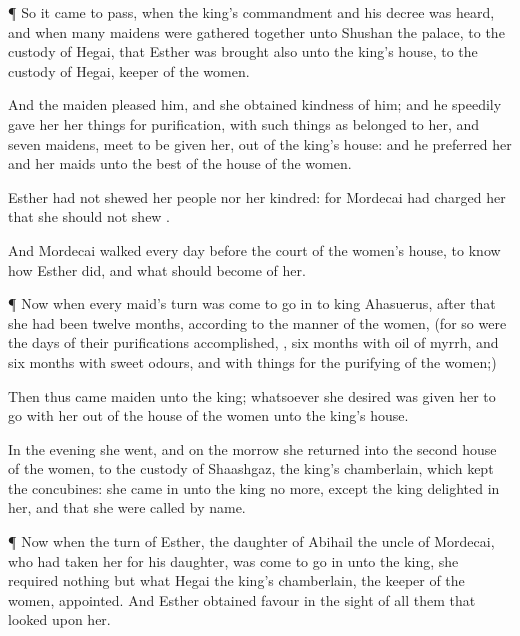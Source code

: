 {\par }{\PP {}¶ So it came to pass, when the
king’s
commandment and his
decree was
heard, and when
many
maidens were gathered
together unto
Shushan the
palace, to the
custody of
Hegai, that
Esther was
brought also unto the
king’s
house, to the
custody of
Hegai,
keeper of the
women.

And the
maiden
pleased him, and she
obtained
kindness of
him; and he
speedily
gave her her things for
purification, with such things as
belonged to her, and
seven
maidens,
{}
meet to be
given her, out of the
king’s
house: and he
preferred her and her
maids unto the
best
{} of the
house of the
women.

Esther had not
shewed her
people nor her
kindred: for
Mordecai had
charged her that she should not
shew
{}.

And
Mordecai
walked every
day
before the
court of the
women’s
house, to
know how
Esther
did, and what should
become of her.


\par }{\PP {}¶ Now when every
maid’s
turn was
come to go
in to
king
Ahasuerus,
after that she had been
twelve
months, according to the
manner of the
women, (for so were the
days of their
purifications
accomplished,
{},
six
months with
oil of
myrrh, and
six
months with sweet
odours, and with
{} things for the
purifying of the
women;)

Then thus
came
{}
maiden unto the
king; whatsoever she
desired was
given her to
go with her out of the
house of the
women unto the
king’s
house.

In the
evening she
went, and on the
morrow she
returned into the
second
house of the
women, to the
custody of
Shaashgaz, the
king’s
chamberlain, which
kept the
concubines: she came
in unto the
king no more, except the
king
delighted in her, and that she were
called by
name.


\par }{\PP {}¶ Now when the
turn of
Esther, the
daughter of
Abihail the
uncle of
Mordecai, who had
taken her for his
daughter, was
come to go
in unto the
king, she
required
nothing but what
Hegai the
king’s
chamberlain, the
keeper of the
women,
appointed. And
Esther
obtained
favour in the
sight of all them that
looked upon her.

}
